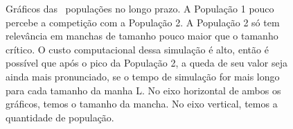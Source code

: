 \documentclass{article}
\begin{document}
	\begin{figure}[h]
		\centering
		\qquad
		\caption{Gráficos das ~populações no longo prazo. A População 1 pouco percebe a competição com a População 2. A População 2 só tem relevância em manchas de tamanho pouco maior que o tamanho crítico. O custo computacional dessa simulação é alto, então é possível que após o pico da População 2, a queda de seu valor seja ainda mais pronunciado, se o tempo de simulação for mais longo para cada tamanho da manha L. No eixo horizontal de ambos os gráficos, temos o tamanho da mancha. No eixo vertical, temos a quantidade de população.}
		\label{fig:Two-P-21-Population-Competition-Time}
	\end{figure}	
\end{document}
